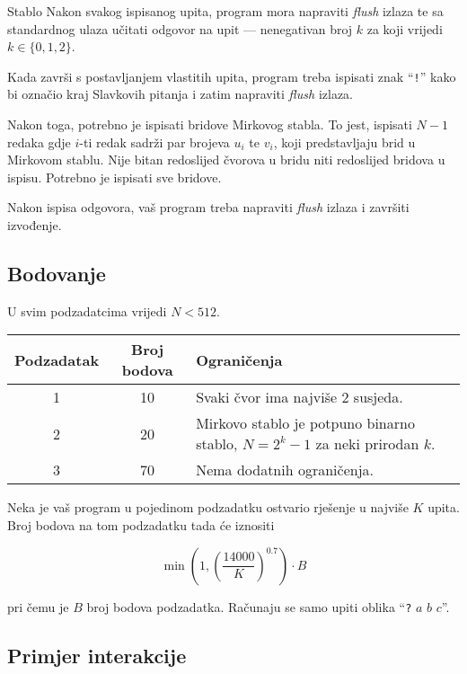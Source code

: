 \begin{statement}[
  problempoints=100,
  timelimit=1 sekunda,
  memorylimit=512 MiB,
]{Stablo}
Nakon svakog ispisanog upita, program mora napraviti \textit{flush} izlaza te sa standardnog ulaza učitati odgovor na upit — nenegativan broj $k$ za koji vrijedi $k \in \{0, 1, 2\}$.

Kada završi s postavljanjem vlastitih upita, program treba ispisati znak ``\texttt{!}'' kako bi označio kraj Slavkovih pitanja i zatim napraviti \textit{flush} izlaza.

Nakon toga, potrebno je ispisati bridove Mirkovog stabla. To jest, ispisati $N - 1$ redaka gdje $i$-ti redak sadrži par brojeva $u_i$ te $v_i$, koji predstavljaju brid u Mirkovom stablu. Nije bitan redoslijed čvorova u bridu niti redoslijed bridova u ispisu. Potrebno je ispisati sve bridove.

Nakon ispisa odgovora, vaš program treba napraviti \textit{flush} izlaza i završiti izvođenje.

\subsection*{Bodovanje}

U svim podzadatcima vrijedi $N < 512$.

{\renewcommand{\arraystretch}{1.4}
  \setlength{\tabcolsep}{6pt}
  \begin{tabular}{ccl}
   Podzadatak & Broj bodova & Ograničenja \\ \midrule
   	1 & 10 & Svaki čvor ima najviše $2$ susjeda. \\
    2 & 20 & Mirkovo stablo je potpuno binarno stablo, $N = 2^k-1$ za neki prirodan $k$. \\
    3 & 70 & Nema dodatnih ograničenja. \\
\end{tabular}}

Neka je vaš program u pojedinom podzadatku ostvario rješenje u najviše $K$ upita. Broj bodova na tom podzadatku tada će iznositi

\[
\min\left(1, \left(\frac{14000}{K}\right)^{0.7}\right) \cdot B
\]

pri čemu je $B$ broj bodova podzadatka. Računaju se samo upiti oblika ``\texttt{?} $a$ $b$ $c$''.

\subsection*{Primjer interakcije}


\end{statement}

